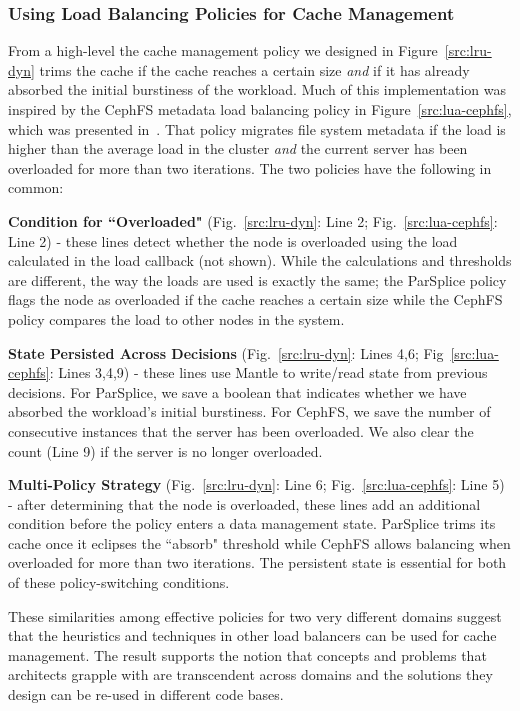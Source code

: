 \subsubsection{Using Load Balancing Policies for Cache Management}

From a high-level the cache management policy we designed in
Figure~\ref{src:lru-dyn} trims the cache if the cache reaches a certain size
{\it and} if it has already absorbed the initial burstiness of the workload.
Much of this implementation was inspired by the CephFS metadata load
balancing policy in Figure~\ref{src:lua-cephfs}, which was presented
in~\cite{sevilla:sc15-mantle}. That policy migrates file system metadata if the
load is higher than the average load in the cluster {\it and} the current
server has been overloaded for more than two iterations. The two policies have
the following in common:

\textbf{Condition for ``Overloaded"} (Fig.~\ref{src:lru-dyn}: Line 2;
Fig.~\ref{src:lua-cephfs}: Line 2) - these lines detect whether the node is
overloaded using the load calculated in the load callback (not shown). While
the calculations and thresholds are different, the way the loads are used is
exactly the same; the ParSplice policy flags the node as overloaded if the
cache reaches a certain size while the CephFS policy compares the load to other
nodes in the system.

\textbf{State Persisted Across Decisions} (Fig.~\ref{src:lru-dyn}: Lines 4,6;
Fig~\ref{src:lua-cephfs}: Lines 3,4,9) - these lines use Mantle to write/read state
from previous decisions.  For ParSplice, we save a boolean that indicates
whether we have absorbed the workload's initial burstiness. For CephFS, we save
the number of consecutive instances that the server has been overloaded. We
also clear the count (Line 9) if the server is no longer overloaded. 

\textbf{Multi-Policy Strategy} (Fig.~\ref{src:lru-dyn}: Line 6;
Fig.~\ref{src:lua-cephfs}: Line 5) - after determining that the node is
overloaded, these lines add an additional condition before the policy enters a
data management state.  ParSplice trims its cache once it eclipses the
``absorb" threshold while CephFS allows balancing when overloaded for more than
two iterations. The persistent state is essential for both of these
policy-switching conditions.

These similarities among effective policies for two very different domains
suggest that the heuristics and techniques in other load balancers can be used
for cache management. The result supports the notion that concepts and problems
that architects grapple with are transcendent across domains and the solutions
they design can be re-used in different code bases.

